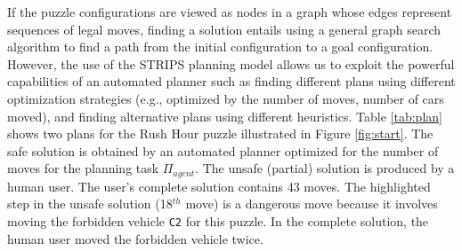 \documentclass[doctor]{thesis} %
\theoremstyle{plain}
\begin{document}
If the puzzle configurations are viewed as nodes in a graph whose edges represent sequences of legal moves, finding a solution entails using a general graph search algorithm to find a path from the initial configuration to a goal configuration. However, the use of the STRIPS planning model allows us to exploit the powerful capabilities of an automated planner such as finding different plans using different optimization strategies (e.g., optimized by the number of moves, number of cars moved),  and finding alternative plans using different heuristics. Table \ref{tab:plan} shows two plans for the Rush Hour puzzle illustrated in Figure \ref{fig:start}. The safe solution is obtained by an automated planner optimized for the number of moves for the planning task $\Pi_{agent}$. The unsafe (partial) solution is produced by a human user. The user's complete solution contains 43 moves. The highlighted step in the unsafe solution (18$^{th}$ move) is a dangerous move because it involves moving the forbidden vehicle \texttt{C2} for this puzzle. In the complete solution, the human user moved the forbidden vehicle twice.
\end{document}
